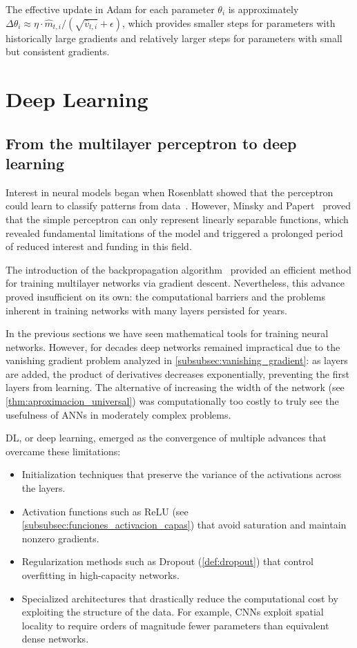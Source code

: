 The effective update in \gls{Adam} for each parameter \(\theta_i\) is approximately \(\Delta\theta_i \approx \eta \cdot \hat{m}_{t,i} / (\sqrt{\hat{v}_{t,i}} + \epsilon)\), which provides smaller steps for parameters with historically large gradients and relatively larger steps for parameters with small but consistent gradients.

\section{Deep Learning}

\subsection{From the multilayer perceptron to deep learning}

Interest in neural models began when Rosenblatt showed that the perceptron could learn to classify patterns from data~\citep{rosenblatt1958perceptron}. However, Minsky and Papert~\citep{minsky1969perceptrons} proved that the simple perceptron can only represent linearly separable functions, which revealed fundamental limitations of the model and triggered a prolonged period of reduced interest and funding in this field.

The introduction of the backpropagation algorithm~\citep{backpropagation} provided an efficient method for training multilayer networks via gradient descent. Nevertheless, this advance proved insufficient on its own: the computational barriers and the problems inherent in training networks with many layers persisted for years.

In the previous sections we have seen mathematical tools for training neural networks. However, for decades deep networks remained impractical due to the vanishing gradient problem analyzed in \autoref{subsubsec:vanishing_gradient}: as layers are added, the product of derivatives decreases exponentially, preventing the first layers from learning. The alternative of increasing the width of the network (see \autoref{thm:aproximacion_universal}) was computationally too costly to truly see the usefulness of \glspl{ANN} in moderately complex problems.

\gls{DL}, or deep learning, emerged as the convergence of multiple advances that overcame these limitations:
\begin{itemize}
	\item Initialization techniques that preserve the variance of the activations across the layers.
	\item Activation functions such as \gls{ReLU} (see \autoref{subsubsec:funciones_activacion_capas}) that avoid saturation and maintain nonzero gradients.
	\item Regularization methods such as Dropout (\autoref{def:dropout}) that control overfitting in high-capacity networks.
	\item Specialized architectures that drastically reduce the computational cost by exploiting the structure of the data. For example, \glspl{CNN} exploit spatial locality to require orders of magnitude fewer parameters than equivalent dense networks.
\end{itemize}

